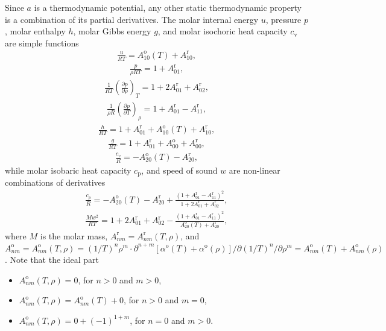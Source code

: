 Since $a$ is a thermodynamic potential, any other static thermodynamic property is a combination of its partial derivatives. The molar internal energy $u$, pressure $p$, molar enthalpy $h$, molar Gibbs energy $g$, and molar isochoric heat capacity $c_\mathrm{v}$ are simple functions
\begin{align}
\frac{u}{RT}=A^\text{o}_{10}(T)+A^\text{r}_{10},
\label{eq:internalen}
\end{align}
\begin{align}
\frac{p}{\rho RT}=1+A^\text{r}_{01},
\label{eq:pressure}
\end{align}
\begin{align}
\frac{1}{RT}\left(\frac{\partial p}{\partial \rho}\right)_T=1+2A^\text{r}_{01}+A^\text{r}_{02},
\label{eq:dpdrho}
\end{align}
\begin{align}
\frac{1}{\rho{R}}\left(\frac{\partial p}{\partial T}\right)_\rho=1+A^\text{r}_{01}-A^\text{r}_{11},
\label{eq:dpdt}
\end{align}
\begin{align}
\frac{h}{RT}=1+A^\text{r}_{01}+A^\text{o}_{10}(T)+A^\text{r}_{10},
\label{eq:enthalpy}
\end{align}
\begin{align}
\frac{g}{RT}=1+A^\text{r}_{01}+A^\text{o}_{00}+A^\text{r}_{00},
\label{eq:gibbs}
\end{align}
\begin{align}
\frac{c_v}{R}=-A^\text{o}_{20}(T)-A^\text{r}_{20},
\label{eq:cv}
\end{align}
while molar isobaric heat capacity $c_\mathrm{p}$, and speed of sound $w$ are non-linear combinations of derivatives
\begin{align}
\frac{c_p}{R}=-A^\text{o}_{20}(T)-A^\text{r}_{20}+\frac{(1+A^\text{r}_{01}-A^\text{r}_{11})^2}{1+2A^\text{r}_{01}+A^\text{r}_{02}},
\label{eq:cp}
\end{align}
\begin{align}
\frac{Mw^2}{RT}=1+2A^\text{r}_{01}+A^\text{r}_{02}-\frac{(1+A^\text{r}_{01}-A^\text{r}_{11})^2}{A^\text{o}_{20}(T)+A^\text{r}_{20}},
\label{eq:sos}
\end{align}
where $M$ is the molar mass, $A^\text{r}_{nm}=A^\text{r}_{nm}(T, \rho)$, and $A^\text{o}_{nm}=A^\text{o}_{nm}(T, \rho)=(1/T)^n \rho^m \cdot \partial^{n+m}[\alpha^\text{o}(T)+\alpha^\text{o}(\rho)]/\partial(1/T)^n / \partial \rho^m =A^\text{o}_{nm}(T)+A^\text{o}_{nm}(\rho)$. Note that the ideal part
\begin{itemize}
	\item $A^\text{o}_{nm}(T, \rho)=0$, for $n>0$ and $m>0$,
	\item $A^\text{o}_{nm}(T, \rho)=A^\text{o}_{nm}(T)+0$, for $n>0$ and $m=0$,
	\item $A^\text{o}_{nm}(T, \rho)=0+(-1)^{1+m}$, for $n=0$ and $m>0$.
\end{itemize}
